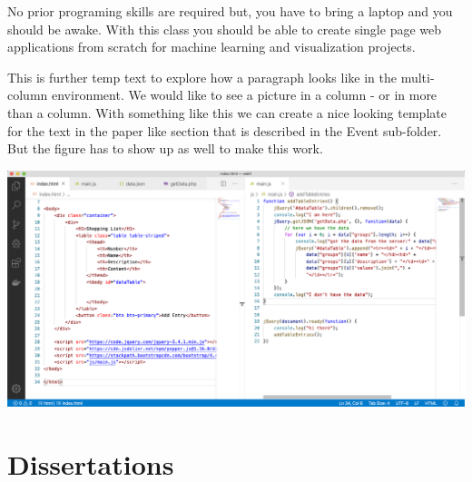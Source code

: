 \documentclass[11pt,fleqn]{book} %
\begin{document}
\begin{multicols}{3}
[
    \subtitle{A programming class for the absolute beginners}
]
\noindent No prior programing skills are required but, you have to bring a laptop and 
you should be awake. With this class you should be able to create single page web
applications from scratch for machine learning and visualization projects.

\noindent This is further temp text to explore how a paragraph looks like in the multi-column environment. We 
would like to see a picture in a column - or in more than a column. With something like this we can
create a nice looking template for the text in the paper like section that is described in the Event
sub-folder. But the figure has to show up as well to make this work.

\begin{Figure}
    \centering
    \includegraphics[width=\linewidth]{../Events/ev01/image.png} %
\end{Figure}

\end{multicols}




\chapter{Dissertations}
\newpage
\end{document}
